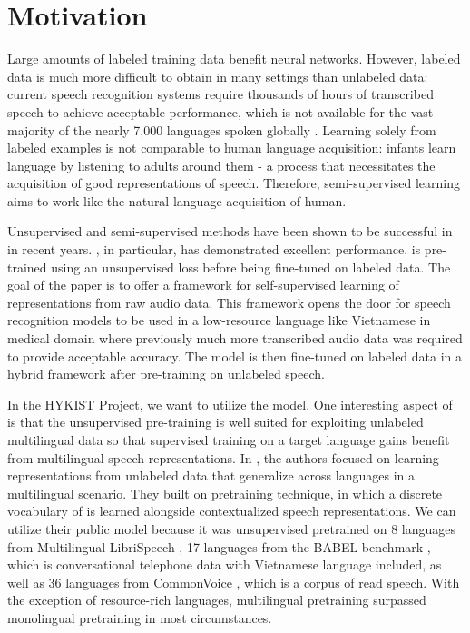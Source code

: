 \section{Motivation}
\label{sec: Motivation}

Large amounts of labeled training data benefit neural networks. 
However, labeled data is much more difficult to obtain in many settings than unlabeled data: current speech recognition systems require thousands of hours of transcribed speech to achieve acceptable performance, which is not available for the vast majority of the nearly 7,000 languages spoken globally \cite{ethnologue}. 
Learning solely from labeled examples is not comparable to human language acquisition: infants learn language by listening to adults around them - a process that necessitates the acquisition of good representations of speech.
Therefore, semi-supervised learning aims to work like the natural language acquisition of human.

Unsupervised and semi-supervised methods have been shown to be successful in  in recent years. 
 \cite{wav2vec2}, in particular, has demonstrated excellent performance. 
 is pre-trained using an unsupervised loss before being fine-tuned on labeled data.
The goal of the paper is to offer a framework for self-supervised learning of representations from raw audio data. 
This framework opens the door for speech recognition models to be used in a low-resource language like Vietnamese in medical domain where previously much more transcribed audio data was required to provide acceptable accuracy. 
The model is then fine-tuned on labeled data in a hybrid framework \cite{RASR-hybrid_vs_attention} after pre-training on unlabeled speech.

In the HYKIST Project, we want to utilize the  model. 
One interesting aspect of  is that the unsupervised pre-training is well suited for exploiting unlabeled multilingual data so that supervised training on a target language gains benefit from multilingual speech representations. 
In \cite{xlsr53}, the authors focused on learning representations from unlabeled data that generalize across languages in a multilingual scenario. 
They built on  pretraining technique, in which a discrete vocabulary of  is learned alongside contextualized speech representations. 
We can utilize their public model  because it was unsupervised pretrained on 8 languages from Multilingual LibriSpeech \cite{multiling_librispeech}, 17 languages from the BABEL benchmark \cite{BABEL_dataset}, which is conversational telephone data with Vietnamese language included, as well as 36 languages from CommonVoice \cite{CommonVoice_dataset}, which is a corpus of read speech. 
With the exception of resource-rich languages, multilingual pretraining surpassed monolingual pretraining in most circumstances.



\pagebreak